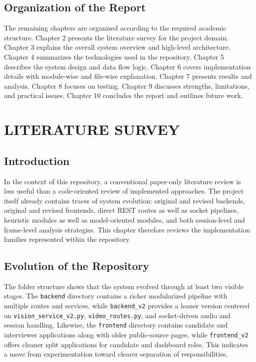 \documentclass[12pt,a4paper]{extreport}
\begin{document}
\section{Organization of the Report}
The remaining chapters are organized according to the required academic structure. Chapter 2 presents the literature survey for the project domain. Chapter 3 explains the overall system overview and high-level architecture. Chapter 4 summarizes the technologies used in the repository. Chapter 5 describes the system design and data flow logic. Chapter 6 covers implementation details with module-wise and file-wise explanation. Chapter 7 presents results and analysis. Chapter 8 focuses on testing. Chapter 9 discusses strengths, limitations, and practical issues. Chapter 10 concludes the report and outlines future work.

\chapter{LITERATURE SURVEY}
\section{Introduction}
In the context of this repository, a conventional paper-only literature review is less useful than a code-oriented review of implemented approaches. The project itself already contains traces of system evolution: original and revised backends, original and revised frontends, direct REST routes as well as socket pipelines, heuristic modules as well as model-oriented modules, and both session-level and frame-level analysis strategies. This chapter therefore reviews the implementation families represented within the repository.

\section{Evolution of the Repository}
The folder structure shows that the system evolved through at least two visible stages. The \texttt{backend} directory contains a richer modularized pipeline with multiple routes and services, while \texttt{backend\_v2} provides a leaner version centered on \texttt{vision\_service\_v2.py}, \texttt{video\_routes.py}, and socket-driven audio and session handling. Likewise, the \texttt{frontend} directory contains candidate and interviewer applications along with older public-source pages, while \texttt{frontend\_v2} offers cleaner split applications for candidate and dashboard roles. This indicates a move from experimentation toward clearer separation of responsibilities.
\end{document}
